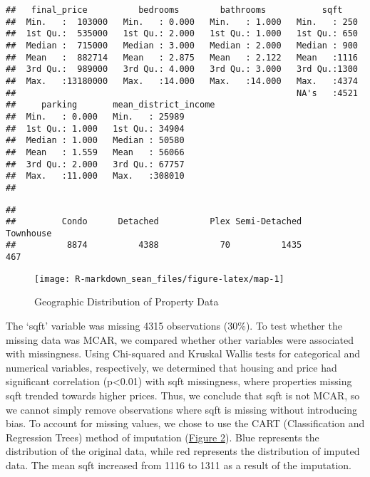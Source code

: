 \documentclass[11pt,]{article}
\begin{document}
\begin{verbatim}
##   final_price          bedrooms        bathrooms           sqft     
##  Min.   :  103000   Min.   : 0.000   Min.   : 1.000   Min.   : 250  
##  1st Qu.:  535000   1st Qu.: 2.000   1st Qu.: 1.000   1st Qu.: 650  
##  Median :  715000   Median : 3.000   Median : 2.000   Median : 900  
##  Mean   :  882714   Mean   : 2.875   Mean   : 2.122   Mean   :1116  
##  3rd Qu.:  989000   3rd Qu.: 4.000   3rd Qu.: 3.000   3rd Qu.:1300  
##  Max.   :13180000   Max.   :14.000   Max.   :14.000   Max.   :4374  
##                                                       NA's   :4521  
##     parking       mean_district_income
##  Min.   : 0.000   Min.   : 25989      
##  1st Qu.: 1.000   1st Qu.: 34904      
##  Median : 1.000   Median : 50580      
##  Mean   : 1.559   Mean   : 56066      
##  3rd Qu.: 2.000   3rd Qu.: 67757      
##  Max.   :11.000   Max.   :308010      
## 
\end{verbatim}

\begin{verbatim}
## 
##         Condo      Detached          Plex Semi-Detached     Townhouse 
##          8874          4388            70          1435           467
\end{verbatim}

\begin{figure}

{\centering \texttt{[image: R-markdown\_sean\_files/figure-latex/map-1]} 

}

\caption{Geographic Distribution of Property Data\label{sec:map}}\label{fig:map}
\end{figure}

The `sqft' variable was missing 4315 observations (30\%). To test
whether the missing data was MCAR, we compared whether other variables
were associated with missingness. Using Chi-squared and Kruskal Wallis
tests for categorical and numerical variables, respectively, we
determined that housing and price had significant correlation
(p\textless0.01) with sqft missingness, where properties missing sqft
trended towards higher prices. Thus, we conclude that sqft is not MCAR,
so we cannot simply remove observations where sqft is missing without
introducing bias. To account for missing values, we chose to use the
CART (Classification and Regression Trees) method of imputation
(\hyperref[sec:fig2]{Figure 2}). Blue represents the distribution of the
original data, while red represents the distribution of imputed data.
The mean sqft increased from 1116 to 1311 as a result of the imputation.
\end{document}
